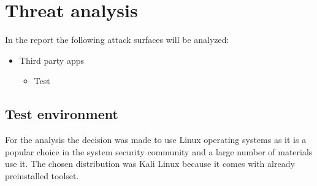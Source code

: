 \section{Threat analysis}

In the report the following attack surfaces will be analyzed:

\begin{itemize}
    \item Third party apps
    \begin{itemize}
        \item Test
    \end{itemize}
\end{itemize}



\subsection{Test environment}
For the analysis the decision was made to use Linux operating systems as it is a popular choice in the system security community and a large number of materials use it.
The chosen distribution was Kali Linux because it comes with already preinstalled toolset.

